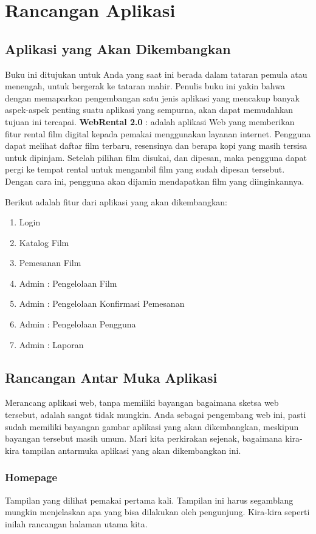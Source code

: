 \chapter{Rancangan Aplikasi}
\section{Aplikasi yang Akan Dikembangkan}
Buku ini ditujukan untuk Anda yang saat ini berada dalam tataran pemula atau menengah, untuk bergerak ke tataran mahir. Penulis buku ini yakin bahwa dengan memaparkan pengembangan satu jenis aplikasi yang mencakup banyak aspek-aspek penting suatu aplikasi yang sempurna, akan dapat memudahkan tujuan ini tercapai. \textbf{WebRental 2.0} : adalah aplikasi Web yang memberikan fitur rental film digital kepada pemakai menggunakan layanan internet. Pengguna dapat melihat daftar film terbaru, resensinya dan berapa kopi yang masih tersisa untuk dipinjam. Setelah pilihan film disukai, dan dipesan, maka pengguna dapat pergi ke tempat rental untuk mengambil film yang sudah dipesan tersebut. Dengan cara ini, pengguna akan dijamin mendapatkan film yang diinginkannya.

Berikut adalah fitur dari aplikasi yang akan dikembangkan:
\begin{enumerate}
\item Login
\item Katalog Film
\item Pemesanan Film
\item Admin : Pengelolaan Film
\item Admin : Pengelolaan Konfirmasi Pemesanan
\item Admin : Pengelolaan Pengguna
\item Admin : Laporan
\end{enumerate}

\section{Rancangan Antar Muka Aplikasi}
Merancang aplikasi web, tanpa memiliki bayangan bagaimana sketsa web tersebut, adalah sangat tidak mungkin. Anda sebagai pengembang web ini, pasti sudah memiliki bayangan gambar aplikasi yang akan dikembangkan, meskipun bayangan tersebut masih umum. Mari kita perkirakan sejenak, bagaimana kira-kira tampilan antarmuka aplikasi yang akan dikembangkan ini.
\subsection{Homepage}
Tampilan yang dilihat pemakai pertama kali. Tampilan ini harus segamblang mungkin menjelaskan apa yang bisa dilakukan oleh pengunjung. Kira-kira seperti inilah rancangan halaman utama kita. 

